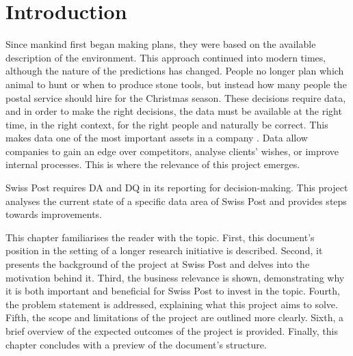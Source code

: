 \chapter{Introduction}

Since mankind first began making plans, they were based on the available description of the environment. This approach continued into modern times, although the nature of the predictions has changed. People no longer plan which animal to hunt or when to produce stone tools, but instead how many people the postal service should hire for the Christmas season. These decisions require data, and in order to make the right decisions, the data must be available at the right time, in the right context, for the right people and naturally be correct. This makes data one of the most important assets in a company \cite{economist2017_dataoil}. Data allow companies to gain an edge over competitors, analyse clients’ wishes, or improve internal processes. This is where the relevance of this project emerges. 



Swiss Post requires \gls{DA} and \gls{DQ} in its reporting for decision-making. This project analyses the current state of a specific data area of Swiss Post and provides steps towards improvements.

This chapter familiarises the reader with the topic. First, this document's position in the setting of a longer research initiative is described. Second, it presents the background of the project at Swiss Post and delves into the motivation behind it. Third, the business relevance is shown, demonstrating why it is both important and beneficial for Swiss Post to invest in the topic. Fourth, the problem statement is addressed, explaining what this project aims to solve. Fifth, the scope and limitations of the project are outlined more clearly. Sixth, a brief overview of the expected outcomes of the project is provided. Finally, this chapter concludes with a preview of the document’s structure.







